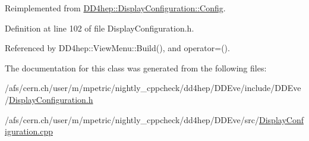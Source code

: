 Reimplemented from \hyperlink{class_d_d4hep_1_1_display_configuration_1_1_config_a39e4104003d0a6fe90053120cc97fd60}{DD4hep::DisplayConfiguration::Config}.

Definition at line 102 of file DisplayConfiguration.h.

Referenced by DD4hep::ViewMenu::Build(), and operator=().

The documentation for this class was generated from the following files:\begin{DoxyCompactItemize}
\item 
/afs/cern.ch/user/m/mpetric/nightly\_\-cppcheck/dd4hep/DDEve/include/DDEve/\hyperlink{_display_configuration_8h}{DisplayConfiguration.h}\item 
/afs/cern.ch/user/m/mpetric/nightly\_\-cppcheck/dd4hep/DDEve/src/\hyperlink{_display_configuration_8cpp}{DisplayConfiguration.cpp}\end{DoxyCompactItemize}
